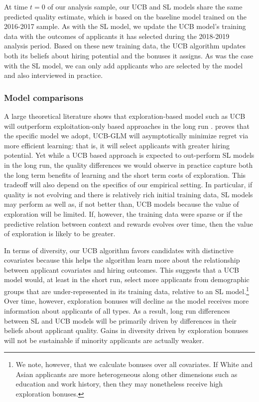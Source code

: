 \documentclass[crop,noquery,editorname,historyrev,nosurname,runningno,sepcount]{RESTUD}
\begin{document}
At time $t=0$ of our analysis sample, our UCB and SL models share the same predicted quality estimate, which is based on the baseline model trained on the 2016-2017 sample.  As with the SL model, we update the UCB model's training data with the outcomes of applicants it has selected during the 2018-2019 analysis period.  Based on these new training data, the UCB algorithm updates both its beliefs about hiring potential and the bonuses it assigns.  As was the case with the SL model, we can only add applicants who are selected by the model and also interviewed in practice.   

\subsubsection{Model comparisons} 

A large theoretical literature shows that exploration-based model such as UCB will outperform exploitation-only based approaches in the long run \citep{dimakopoulou_estimation_2018}.  \citet{li2017} proves that the specific model we adopt, UCB-GLM will asymptotically minimize regret via more efficient learning: that is, it will select applicants with greater hiring potential. Yet while a UCB based approach is expected to out-perform SL models in the long run, the quality differences we would observe in practice capture both the long term benefits of learning and the short term costs of exploration. This tradeoff will also depend on the specifics of our empirical setting.  In particular, if quality is not evolving and there is relatively rich initial training data, SL models may perform as well as, if not better than, UCB models because the value of exploration will be limited. If, however, the training data were sparse or if the predictive relation between context and rewards evolves over time, then the value of exploration is likely to be greater.  

In terms of diversity, our UCB algorithm favors candidates with distinctive covariates because this helps the algorithm learn more about the relationship between applicant covariates and hiring outcomes.  This suggests that a UCB model would, at least in the short run, select more applicants from demographic groups that are under-represented in its training data, relative to an SL model.\footnote{We note, however, that we calculate bonuses over all covariates.  If White and Asian applicants are more heterogeneous along other dimensions such as education and work history, then they may nonetheless receive high exploration bonuses.} Over time, however, exploration bonuses will decline as the model receives more information about applicants of all types.  As a result, long run differences between SL and UCB models will be primarily driven by differences in their beliefs about applicant quality.  Gains in diversity driven by exploration bonuses will not be sustainable if minority applicants are actually weaker.  
\end{document}
